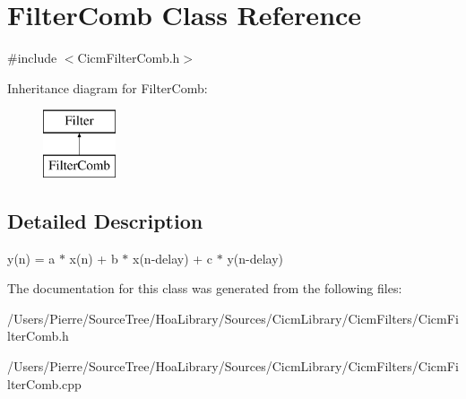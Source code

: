\hypertarget{class_filter_comb}{\section{Filter\-Comb Class Reference}
\label{class_filter_comb}
}


{\ttfamily \#include $<$Cicm\-Filter\-Comb.\-h$>$}

Inheritance diagram for Filter\-Comb\-:\begin{figure}[H]
\begin{center}
\leavevmode
\includegraphics[height=2.000000cm]{class_filter_comb}
\end{center}
\end{figure}


\subsection{Detailed Description}
y(n) = a $\ast$ x(n) + b $\ast$ x(n-\/delay) + c $\ast$ y(n-\/delay) 

The documentation for this class was generated from the following files\-:\begin{DoxyCompactItemize}
\item 
/\-Users/\-Pierre/\-Source\-Tree/\-Hoa\-Library/\-Sources/\-Cicm\-Library/\-Cicm\-Filters/Cicm\-Filter\-Comb.\-h\item 
/\-Users/\-Pierre/\-Source\-Tree/\-Hoa\-Library/\-Sources/\-Cicm\-Library/\-Cicm\-Filters/Cicm\-Filter\-Comb.\-cpp\end{DoxyCompactItemize}
